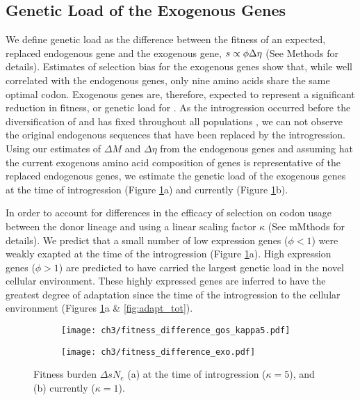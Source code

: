 \subsection{Genetic Load of the Exogenous Genes}

We define genetic load as the difference between the fitness of an expected, replaced endogenous gene and the exogenous gene, $s \propto \phi {\Delta \eta}$ (See Methods for details).
Estimates of selection bias for the exogenous genes show that, while well correlated with the endogenous genes, only nine amino acids share the same optimal codon.
Exogenous genes are, therefore, expected to represent a significant reduction in fitness, or genetic load for \kluyveri.
As the introgression occurred before the diversification of \kluyveri and has fixed throughout all populations \citep{friedrich2015}, we can not observe the original endogenous sequences that have been replaced by the introgression.
Using our estimates of $\Delta M$ and $\Delta \eta$ from the endogenous genes and assuming hat the current exogenous amino acid composition of genes is representative of the replaced endogenous genes, we estimate the genetic load of the exogenous genes at the time of introgression (Figure \ref{fig:sne_fitness_burden}a) and currently (Figure \ref{fig:sne_fitness_burden}b).

In order to account for differences in the efficacy of selection on codon usage between the donor lineage and \kluyveri using a linear scaling factor $\kappa$ (See mMthods for details).
We predict that a small number of low expression genes ($\phi < 1$) were weakly exapted at the time of the introgression (Figure \ref{fig:sne_fitness_burden}a).
High expression genes ($\phi > 1$) are predicted to have carried the largest genetic load in the novel cellular environment.
These highly expressed genes are inferred to have the greatest degree of adaptation since the time of the introgression to the \kluyveri cellular environment (Figures \ref{fig:sne_fitness_burden}a \& \ref{fig:adapt_tot}).

\begin{figure}
    \centering
    \begin{subfigure}
        \centering
        \texttt{[image: ch3/fitness\_difference\_gos\_kappa5.pdf]}
    \end{subfigure}
    \begin{subfigure}
        \centering
        \texttt{[image: ch3/fitness\_difference\_exo.pdf]}
    \end{subfigure}
    \caption{Fitness burden $\Delta sN_e$ (a) at the time of introgression ($\kappa = 5$), and (b) currently ($\kappa = 1$). }
    \label{fig:sne_fitness_burden}
\end{figure}


